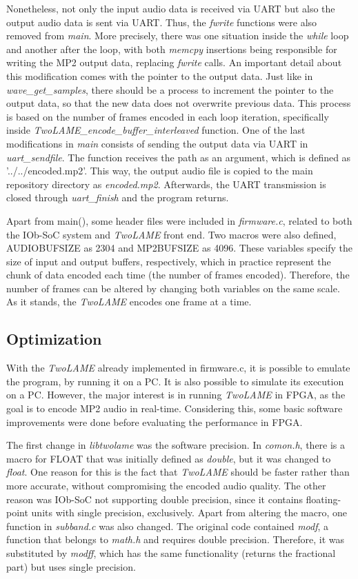 \documentclass{article}
\begin{document}
Nonetheless, not only the input audio data is received via UART but also the output audio data is sent via UART. Thus, the \textit{fwrite} functions were also removed from \textit{main}.
More precisely, there was one situation inside the \textit{while} loop and another after the loop, with both \textit{memcpy} insertions being responsible for writing the MP2 output data, replacing \textit{fwrite} calls. An important detail about this modification comes with the pointer to the output data. Just like in \textit{wave\_get\_samples}, there should be a process to increment the pointer to the output data, so that the new data does not overwrite previous data. This process is based on the number of frames encoded in each loop iteration, specifically inside \textit{\textit{TwoLAME}\_encode\_buffer\_interleaved} function.
One of the last modifications in \textit{main} consists of sending the output data via UART in \textit{uart\_sendfile}. The function receives the path as an argument, which is defined as ’../../encoded.mp2’. This way, the output audio file is copied to the main repository directory as \textit{encoded.mp2}.
Afterwards, the UART transmission is closed through \textit{uart\_finish} and the program returns.

Apart from main(), some header files were included in \textit{firmware.c}, related to both the IOb-SoC system and \textit{TwoLAME} front end. Two macros were also defined, AUDIOBUFSIZE as 2304 and MP2BUFSIZE as 4096. These variables specify the size of input and output buffers, respectively, which in practice represent the chunk of data encoded each time (the number of frames encoded). Therefore, the number of frames can be altered by changing both variables on the same scale. As it stands, the \textit{TwoLAME} encodes one frame at a time.


\subsection{Optimization}

With the \textit{TwoLAME} already implemented in firmware.c, it is possible to emulate the program, by running it on a PC. It is also possible to simulate its execution on a PC. However, the major interest is in running \textit{TwoLAME} in FPGA, as the goal is to encode MP2 audio in real-time. Considering this, some basic software improvements were done before evaluating the performance in FPGA.

The first change in \textit{libtwolame} was the software precision. In \textit{comon.h}, there is a macro for FLOAT that was initially defined as \textit{double}, but it was changed to \textit{float}. One reason for this is the fact that \textit{TwoLAME} should be faster rather than more accurate, without compromising the encoded audio quality. The other reason was IOb-SoC not supporting double precision, since it contains floating-point units with single precision, exclusively. Apart from altering the macro, one function in \textit{subband.c} was also changed. The original code contained \textit{modf}, a function that belongs to \textit{math.h} and requires double precision. Therefore, it was substituted by \textit{modff}, which has the same functionality (returns the fractional part) but uses single precision.
\end{document}
